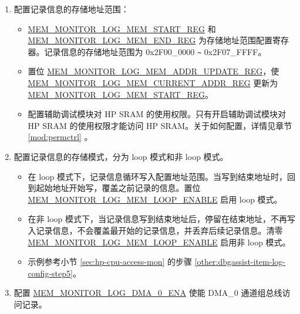 \documentclass[main\_\_CN.tex]{subfiles}
\begin{document}
\begin{enumerate}
\begin{itemize}
            \item 在 halfword 监测模式下，\hyperref[regdesc:MEMMONITORLOGCHECKDATAREG]{MEM\_MONITOR\_LOG\_CHECK\_DATA\_REG}[15:0] 为监测的特定 halfword。
            \item 在 byte 监测模式下，\hyperref[regdesc:MEMMONITORLOGCHECKDATAREG]{MEM\_MONITOR\_LOG\_CHECK\_DATA\_REG}[7:0] 为监测的特定 byte。
            \item \hyperref[regdesc:MEMMONITORLOGDATAMASKREG]{MEM\_MONITOR\_LOG\_DATA\_MASK\_REG} 用于屏蔽 \hyperref[regdesc:MEMMONITORLOGCHECKDATAREG]{MEM\_MONITOR\_LOG\_CHECK\_DATA\_REG} 的相应 byte。当某一 byte 被屏蔽时，该 byte 可为任意值。例如，在 word 监测中，若 \hyperref[regdesc:MEMMONITORLOGCHECKDATAREG]{MEM\_MONITOR\_LOG\_CHECK\_DATA\_REG} 配置为 0x01020304，\hyperref[regdesc:MEMMONITORLOGDATAMASKREG]{MEM\_MONITOR\_LOG\_DATA\_MASK\_REG} 配置为 0x1，则只要总线写 0x010203XX 都会被记录。
        \end{itemize}
    \item 配置记录信息的存储地址范围：
        \begin{itemize}
            \item \hyperref[regdesc:MEMMONITORLOGMEMSTARTREG]{MEM\_MONITOR\_LOG\_MEM\_START\_REG} 和 \hyperref[regdesc:MEMMONITORLOGMEMENDREG]{MEM\_MONITOR\_LOG\_MEM\_END\_REG} 为存储地址范围配置寄存器。记录信息的存储地址范围为 0x2F00\_0000 \verb+~+ 0x2F07\_FFFF。
            \item 置位 \hyperref[regdesc:MEMMONITORLOGMEMADDRUPDATEREG]{MEM\_MONITOR\_LOG\_MEM\_ADDR\_UPDATE\_REG}，使 \hyperref[regdesc:MEMMONITORLOGMEMCURRENTADDRREG]{MEM\_MONITOR\_LOG\_MEM\_CURRENT\_ADDR\_REG} 更新为 \hyperref[regdesc:MEMMONITORLOGMEMSTARTREG]{MEM\_MONITOR\_LOG\_MEM\_START\_REG}。
            \item 配置辅助调试模块对 HP SRAM 的使用权限。只有开启辅助调试模块对 HP SRAM 的使用权限才能访问 HP SRAM。关于如何配置，详情见章节 \ref{mod:permctrl} \textit{}。
        \end{itemize}
    \item 配置记录信息的存储模式，分为 loop 模式和非 loop 模式。
        \begin{itemize}
            \item 在 loop 模式下，记录信息循环写入配置地址范围。当写到结束地址时，回到起始地址开始写，覆盖之前记录的信息。置位 \hyperref[fielddesc:MEMMONITORLOGMEMLOOPENABLE]{MEM\_MONITOR\_LOG\_MEM\_LOOP\_ENABLE} 启用 loop 模式。
            \item 在非 loop 模式下，当记录信息写到结束地址后，停留在结束地址，不再写入记录信息，不会覆盖最开始的记录信息，并丢弃后续记录信息。清零 \hyperref[fielddesc:MEMMONITORLOGMEMLOOPENABLE]{MEM\_MONITOR\_LOG\_MEM\_LOOP\_ENABLE} 启用非 loop 模式。\\
            \item 示例参考小节 \ref{sec:hp-cpu-access-mon} 的步骤 \ref{other:dbgassist-item-log-config-step5}。
        \end{itemize}
\item 配置 \hyperref[fielddesc:MEMMONITORLOGDMA0ENA]{MEM\_MONITOR\_LOG\_DMA\_0\_ENA} 使能 DMA\_0 通道组总线访问记录。
\end{enumerate}
\end{document}
